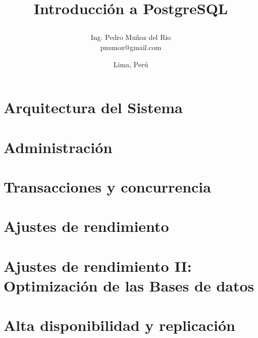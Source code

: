 \documentclass[12pt,a4paper,oneside, openany]{book}
\title{ 
 \begin{center}
  {Introducción a PostgreSQL}\\
 \end{center}
}
\author{Ing. Pedro Muñoz del Rio\\
        pmunoz@gmail.com}
\date{Lima, Perú}
\begin{document}
\renewcommand{\baselinestretch}{1.5} %
\renewcommand{\contentsname}{Índice}
\renewcommand{\listfigurename}{Lista de Gr\'aficos}
\renewcommand{\chaptername}{Cap\'itulo}
\renewcommand{\bibname}{Fuentes de Informaci\'on}
\renewcommand{\figurename}{Gr\'afico}
\renewcommand{\tablename}{Tabla}

 \maketitle %
 
  \frontmatter  %
 
  
 \tableofcontents %
 \listoffigures   %
      
 \mainmatter  %


 \chapter{Arquitectura del Sistema}
    

 \chapter{Administración}
    

 \chapter{Transacciones y concurrencia}
    
    
 \chapter{Ajustes de rendimiento}
 	
 	
 \chapter{Ajustes de rendimiento II: Optimización de las Bases de datos}
 	
 	
 \chapter{Alta disponibilidad y replicación}
 	
 	
\end{document}
